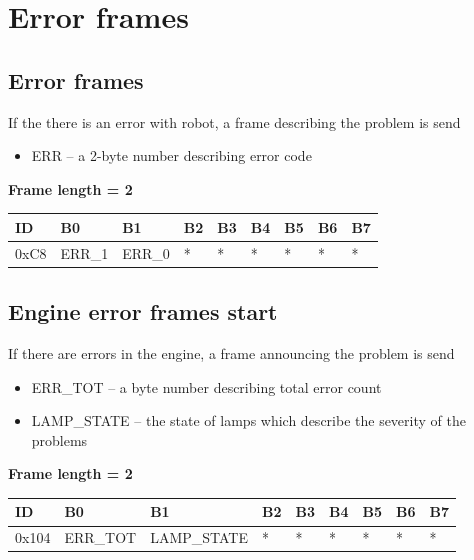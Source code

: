 \documentclass{article}
\begin{document}
\newpage
\section{Error frames}
\subsection{Error frames}
If the there is an error with robot, a frame describing the problem is send
\begin{itemize}
    \item ERR -- a 2-byte number describing error code
\end{itemize}{}

\textbf{Frame length = 2}
\begin{center}
    \begin{tabular}{| p{20pt} | p{40pt} | p{40pt} | p{40pt} | p{40pt} | p{40pt} | p{40pt} | p{40pt} | p{40pt} |}
        \hline
        ID   & B0     & B1     & B2 & B3 & B4 & B5 & B6 & B7 \\
        \hline
        0xC8 & ERR\_1 & ERR\_0 & *  & *  & *  & *  & *  & *  \\
        \hline
    \end{tabular}
\end{center}

\subsection{Engine error frames start}
If there are errors in the engine, a frame announcing the problem is send
\begin{itemize}
    \item ERR\_TOT -- a byte number describing total error count
    \item LAMP\_STATE -- the state of lamps which describe the severity of the problems
\end{itemize}{}

\textbf{Frame length = 2}
\begin{center}
    \begin{tabular}{| p{20pt} | p{45pt} | p{60pt} | p{40pt} | p{40pt} | p{40pt} | p{40pt} | p{40pt} | p{40pt} |}
        \hline
        ID    & B0       & B1          & B2 & B3 & B4 & B5 & B6 & B7 \\
        \hline
        0x104 & ERR\_TOT & LAMP\_STATE & *  & *  & *  & *  & *  & *  \\
        \hline
    \end{tabular}
\end{center}
\end{document}
